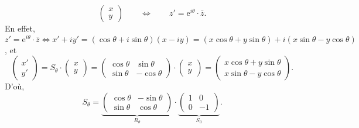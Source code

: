 \begin{rmk}
\begin{enumerate}[label=(\alph*)]
\[\begin{pmatrix}
						x\\ y
					\end{pmatrix} \quad\quad \iff \quad\quad z' = \mathrm{e}^{i\theta} \cdot \bar{z}
			.\] En effet, $z' = \mathrm{e}^{i\theta} \cdot \bar{z} \iff x' + iy' = (\cos \theta + i \sin \theta)(x-iy) = (x \cos \theta + y \sin \theta) + i (x\sin \theta - y \cos \theta)$, et \[
				\begin{pmatrix}
					x'\\y'
				\end{pmatrix} = S_\theta \cdot \begin{pmatrix}
					x\\ y
				\end{pmatrix} = \begin{pmatrix}
					\cos \theta & \sin \theta\\
					\sin \theta & -\cos \theta
				\end{pmatrix} \cdot \begin{pmatrix}
					x\\y
				\end{pmatrix} = \begin{pmatrix}
					x \cos \theta + y \sin \theta\\
					x \sin \theta - y \cos \theta
				\end{pmatrix}
			.\]
			D'où, \[
				S_\theta = \underbrace{\begin{pmatrix}
						\cos \theta & -\sin \theta\\
						\sin \theta & \cos \theta
					\end{pmatrix}}_{R_\theta} \cdot 
					\underbrace{\begin{pmatrix}
							1 & 0\\
							0 & -1
					\end{pmatrix}}_{S_0}
			.\]
	\end{enumerate}
\end{rmk}

